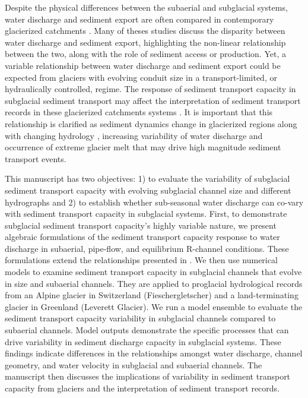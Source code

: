 \documentclass[esurf, manuscript]{copernicus}
\begin{document}
Despite the physical differences between the subaerial and subglacial systems, water discharge and sediment export are often compared in contemporary glacierized catchments \citep[e.g.][]{willis1996,pearce2003,richards2003,swift2005,chu2009,tedstone2012,chu2012,overeem2017,delaney2018,swift2021,lu2022,andresen2024}.
Many of theses studies discuss the disparity between water discharge and sediment export, highlighting the non-linear relationship between the two, along with the role of sediment access or production.
Yet, a variable relationship between water discharge and sediment export could be expected from glaciers with evolving conduit size in a transport-limited, or hydraulically controlled, regime.
The response of sediment transport capacity in subglacial sediment transport may affect the interpretation of sediment transport records in these glacierized catchments systems \citep[e.g.][]{ganti2016,mancini2023}.
It is important that this relationship is clarified as sediment dynamics change in glacierized regions along with changing hydrology \citep[e.g.][]{brunner2019}, increasing variability of water discharge \citep{lane2019} and occurrence of extreme glacier melt  \citep[e.g.][]{overeem2015,cremona2023} that may drive high magnitude sediment transport events.

This manuscript has two objectives: 1) to evaluate the variability of subglacial sediment transport capacity with evolving subglacial channel size and different hydrographs and 2) to establish whether sub-seasonal water discharge can co-vary with sediment transport capacity in subglacial systems.
First, to demonstrate subglacial sediment transport capacity's highly variable nature,  we present algebraic formulations of the sediment transport capacity response to water discharge in subaerial, pipe-flow, and equilibrium R-channel conditions.
These formulations extend the relationships presented in \citet{alley1997}.
We then use numerical models to examine sediment transport capacity in subglacial channels that evolve in size and subaerial channels.
They are applied to proglacial hydrological records from an Alpine glacier in Switzerland (Fieschergletscher) and a land-terminating glacier in Greenland (Leverett Glacier).
We run a model ensemble to evaluate the sediment transport capacity variability in subglacial channels compared to subaerial channels.
Model outputs demonstrate the specific processes that can drive variability in sediment discharge capacity in subglacial systems.
These findings indicate differences in the relationships amongst water discharge, channel geometry, and water velocity in subglacial and subaerial channels.
The manuscript then discusses the implications of variability in sediment transport capacity from glaciers and the interpretation of sediment transport records.
\end{document}
